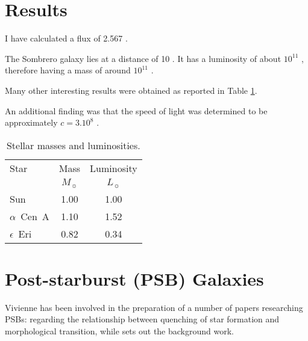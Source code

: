\section{Results}
\label{sec:results}

I have calculated a flux of 2.567 \fluxdensity.

The Sombrero galaxy lies at a distance of 10 \Mpc. It has a luminosity of about $10^{11}$ \Lsun, therefore having a mass of around $10^{11}$ \Msun.

Many other interesting results were obtained as reported in Table \ref{tab:resultstable}.

An additional finding was that the speed of light was determined to be approximately $c=3.10^8$ \ms.


\begin{table}
 \centering
 \caption{Stellar masses and luminosities.}
  \label{tab:resultstable}
 \begin{tabular}{lcc}
  \hline
  Star & Mass & Luminosity\\
   & $M_{\sun}$ & $L_{\sun}$\\
  \hline
  Sun & 1.00 & 1.00\\
  $\alpha$~Cen~A & 1.10 & 1.52\\
  $\epsilon$~Eri & 0.82 & 0.34\\
  \hline
 \end{tabular}
\end{table}

\section{Post-starburst (PSB) Galaxies}
\label{sec:PSB_gals}
Vivienne has been involved in the preparation of a number of papers researching PSBs: \citet{2017MNRAS.472.1401A} regarding the relationship between quenching of star formation and morphological transition, while \citet{2016MNRAS.463..832W} sets out the background work.
